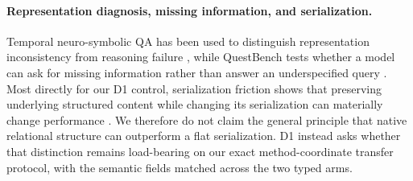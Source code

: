 \paragraph{Representation diagnosis, missing information, and serialization.}
Temporal neuro-symbolic QA has been used to distinguish representation inconsistency from reasoning failure \citep{liem2026temporal}, while QuestBench tests whether a model can ask for missing information rather than answer an underspecified query \citep{li2025questbench}. Most directly for our D1 control, serialization friction shows that preserving underlying structured content while changing its serialization can materially change performance \citep{lo2026serialization}. We therefore do not claim the general principle that native relational structure can outperform a flat serialization. D1 instead asks whether that distinction remains load-bearing on our exact method-coordinate transfer protocol, with the semantic fields matched across the two typed arms.

